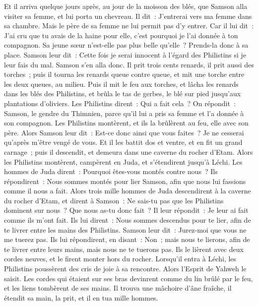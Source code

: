 \begin{multicols}{2}
\VerseOne{}Et il arriva quelque jours après, au jour de la moisson des blés, que Samson alla visiter sa femme, et lui porta un chevreau. Il dit~: J'entrerai vers ma femme dans sa chambre. Mais le père de sa femme ne lui permit pas d'y entrer.
Car il lui dit~: J'ai cru que tu avais de la haine pour elle, c'est pourquoi je l'ai donnée à ton compagnon. Sa jeune sœur n'est-elle pas plus belle qu'elle~? Prends-la donc à sa place.
Samson leur dit~: Cette fois je serai innocent à l'égard des Philistins si je leur fais du mal.
Samson s'en alla donc. Il prit trois cents renards, il prit aussi des torches~; puis il tourna les renards queue contre queue, et mit une torche entre les deux queues, au milieu.
Puis il mit le feu aux torches, et lâcha les renards dans les blés des Philistins, et brûla le tas de gerbes, le blé sur pied jusqu'aux plantations d'oliviers.
Les Philistins dirent~: Qui a fait cela~? On répondit~: Samson, le gendre du Thimnien, parce qu'il lui a pris sa femme et l'a donnée à son compagnon. Les Philistins montèrent, et ils la brûlèrent au feu, elle avec son père.
Alors Samson leur dit~: Est-ce donc ainsi que vous faites~? Je ne cesserai qu'après m'être vengé de vous.
Et il les battit dos et ventre, et en fit un grand carnage~; puis il descendit, et demeura dans une caverne du rocher d'Etam.
Alors les Philistins montèrent, campèrent en Juda, et s'étendirent jusqu'à Léchi.
Les hommes de Juda dirent~: Pourquoi êtes-vous montés contre nous~? Ils répondirent~: Nous sommes montés pour lier Samson, afin que nous lui fassions comme il nous a fait.
Alors trois mille hommes de Juda descendirent à la caverne du rocher d'Etam, et dirent à Samson~: Ne sais-tu pas que les Philistins dominent sur nous~? Que nous as-tu donc fait~? Il leur répondit~: Je leur ai fait comme ils m'ont fait.
Ils lui dirent~: Nous sommes descendus pour te lier, afin de te livrer entre les mains des Philistins. Samson leur dit~: Jurez-moi que vous ne me tuerez pas.
Ils lui répondirent, en disant~: Non~; mais nous te lierons, afin de te livrer entre leurs mains, mais nous ne te tuerons pas. Ils le lièrent avec deux cordes neuves, et le firent monter hors du rocher.
Lorsqu'il entra à Léchi, les Philistins poussèrent des cris de joie à sa rencontre. Alors l'Esprit de Yahweh le saisit. Les cordes qui étaient sur ses bras devinrent comme du lin brûlé par le feu, et les liens tombèrent de ses mains.
Il trouva une mâchoire d'âne fraîche, il étendit sa main, la prit, et il en tua mille hommes.

\end{multicols}
